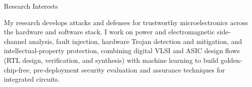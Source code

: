 \documentclass{resume} %
\begin{document}

\begin{rSection}{Research Interests}

My research develops attacks and defenses for trustworthy microelectronics across the hardware and software stack. I work on power and electromagnetic side-channel analysis, fault injection, hardware Trojan detection and mitigation, and intellectual-property protection, combining digital VLSI and ASIC design flows (RTL design, verification, and synthesis) with machine learning to build golden-chip-free, pre-deployment security evaluation and assurance techniques for integrated circuits.
\end{rSection}












\end{document}
